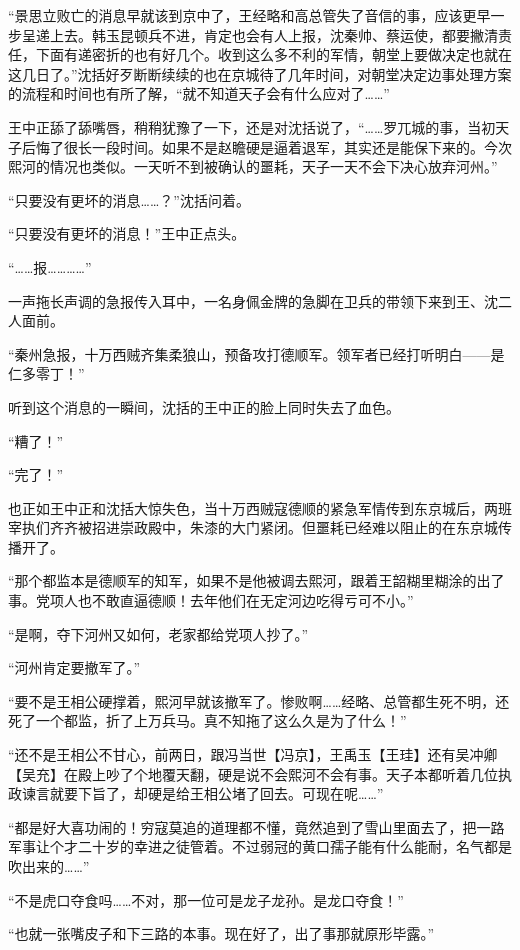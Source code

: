 “景思立败亡的消息早就该到京中了，王经略和高总管失了音信的事，应该更早一步呈递上去。韩玉昆顿兵不进，肯定也会有人上报，沈秦帅、蔡运使，都要撇清责任，下面有递密折的也有好几个。收到这么多不利的军情，朝堂上要做决定也就在这几日了。”沈括好歹断断续续的也在京城待了几年时间，对朝堂决定边事处理方案的流程和时间也有所了解，“就不知道天子会有什么应对了……”

王中正舔了舔嘴唇，稍稍犹豫了一下，还是对沈括说了，“……罗兀城的事，当初天子后悔了很长一段时间。如果不是赵瞻硬是逼着退军，其实还是能保下来的。今次熙河的情况也类似。一天听不到被确认的噩耗，天子一天不会下决心放弃河州。”

“只要没有更坏的消息……？”沈括问着。

“只要没有更坏的消息！”王中正点头。

“……报…………”

一声拖长声调的急报传入耳中，一名身佩金牌的急脚在卫兵的带领下来到王、沈二人面前。

“秦州急报，十万西贼齐集柔狼山，预备攻打德顺军。领军者已经打听明白——是仁多零丁！”

听到这个消息的一瞬间，沈括的王中正的脸上同时失去了血色。

“糟了！”

“完了！”

也正如王中正和沈括大惊失色，当十万西贼寇德顺的紧急军情传到东京城后，两班宰执们齐齐被招进崇政殿中，朱漆的大门紧闭。但噩耗已经难以阻止的在东京城传播开了。

“那个都监本是德顺军的知军，如果不是他被调去熙河，跟着王韶糊里糊涂的出了事。党项人也不敢直逼德顺！去年他们在无定河边吃得亏可不小。”

“是啊，夺下河州又如何，老家都给党项人抄了。”

“河州肯定要撤军了。”

“要不是王相公硬撑着，熙河早就该撤军了。惨败啊……经略、总管都生死不明，还死了一个都监，折了上万兵马。真不知拖了这么久是为了什么！”

“还不是王相公不甘心，前两日，跟冯当世【冯京】，王禹玉【王珪】还有吴冲卿【吴充】在殿上吵了个地覆天翻，硬是说不会熙河不会有事。天子本都听着几位执政谏言就要下旨了，却硬是给王相公堵了回去。可现在呢……”

“都是好大喜功闹的！穷寇莫追的道理都不懂，竟然追到了雪山里面去了，把一路军事让个才二十岁的幸进之徒管着。不过弱冠的黄口孺子能有什么能耐，名气都是吹出来的……”

“不是虎口夺食吗……不对，那一位可是龙子龙孙。是龙口夺食！”

“也就一张嘴皮子和下三路的本事。现在好了，出了事那就原形毕露。”

